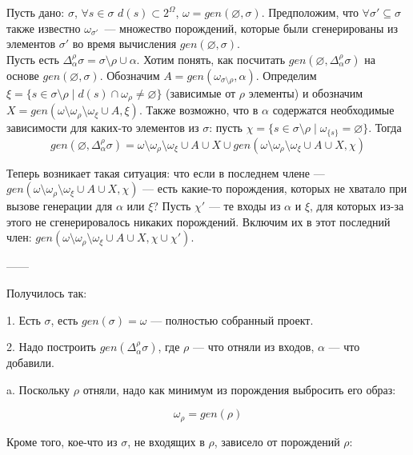 



\newcommand{\Deltasigma}{\Delta_\alpha^\rho\sigma}

Пусть дано: $\sigma$, $\forall s \in \sigma$ $d(s) \subset 2^\Omega$, $\omega = gen(\varnothing, \sigma)$. Предположим, что $\forall \sigma' \subseteq \sigma$ также известно $\omega_{\sigma'}$~--- множество порождений, которые были сгенерированы из элементов $\sigma'$ во время вычисления $gen(\varnothing, \sigma)$.\\

Пусть есть $\Deltasigma = \sigma\setminus\rho\cup\alpha$. Хотим понять, как посчитать $gen(\varnothing, \Deltasigma)$ на основе $gen(\varnothing, \sigma)$. Обозначим $A = gen(\omega_{\sigma\setminus\rho}, \alpha)$. Определим $\xi = \{s \in \sigma\setminus\rho \mid d(s) \cap \omega_\rho \neq \varnothing\}$ (зависимые от $\rho$ элементы) и обозначим $X = gen(\omega \setminus \omega_\rho \setminus \omega_\xi \cup A, \xi)$. Также возможно, что в $\alpha$ содержатся необходимые зависимости для каких-то элементов из $\sigma$: пусть $\chi = \{s \in \sigma\setminus\rho \mid \omega_{\{s\}} = \varnothing\}$. Тогда
$$gen(\varnothing, \Deltasigma) = \omega \setminus \omega_\rho \setminus \omega_\xi \cup A \cup X \cup gen(\omega\setminus\omega_\rho\setminus\omega_\xi \cup A \cup X, \chi)$$

Теперь возникает такая ситуация: что если в последнем члене --- $gen(\omega\setminus\omega_\rho\setminus\omega_\xi \cup A \cup X, \chi)$ --- есть какие-то порождения, которых не хватало при вызове генерации для $\alpha$ или $\xi$? Пусть $\chi'$ --- те входы из $\alpha$ и $\xi$, для которых из-за этого не сгенерировалось никаких порождений. Включим их в этот последний член:  $gen(\omega\setminus\omega_\rho\setminus\omega_\xi \cup A \cup X, \chi \cup \chi')$.

------

Получилось так:

    1. Есть $\sigma$, есть $gen(\sigma)=\omega$ --- полностью собранный проект.
	
    2. Надо построить $gen(\Deltasigma)$, где $\rho$ --- что отняли из входов, $\alpha$ --- что добавили.

		a. Поскольку $\rho$ отняли, надо как минимум из порождения выбросить его образ:

            $$\omega_\rho=gen(\rho)$$

          Кроме того, кое-что из $\sigma$, не входящих в $\rho$, зависело от порождений $\rho$:

